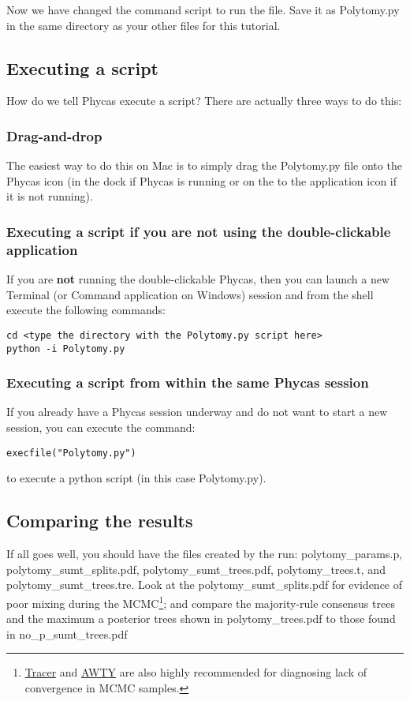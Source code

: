 \documentclass{article}
\newcommand{\phycas}{Phycas\xspace}
\newcommand{\localfile}[1]{\textsf{#1}\xspace}
\begin{document}
Now we have changed the command script to run the file. Save it as \localfile{Polytomy.py} in the same directory as your other files for this tutorial.

\subsection{Executing a script}
How do we tell \phycas execute a script?
There are actually three ways to do this:
\subsubsection{Drag-and-drop}
The easiest way to do this on Mac is to simply drag the \localfile{Polytomy.py} file onto the \phycas icon (in the dock if \phycas is running or on the to the application icon if it is not running).

\subsubsection{Executing a script if you are not using the double-clickable application}
If you are {\bf not} running the double-clickable \phycas, then you can launch a new
Terminal (or Command application on Windows) session and from the shell execute the following commands:
\begin{verbatim}
cd <type the directory with the Polytomy.py script here>
python -i Polytomy.py
\end{verbatim}

\subsubsection{Executing a script from within the same \phycas session}
If you already have a \phycas session underway and do not want to start a
new session, you can execute the command:
\begin{verbatim}
execfile("Polytomy.py")
\end{verbatim}
to execute a python script (in this case  \localfile{Polytomy.py}).


\subsection{Comparing the results}
If all goes well, you should have the files created by the run:
\localfile{polytomy\_params.p}, \localfile{polytomy\_sumt\_splits.pdf}, \localfile{polytomy\_sumt\_trees.pdf}, \localfile{polytomy\_trees.t}, and \localfile{polytomy\_sumt\_trees.tre}.
Look at the \localfile{polytomy\_sumt\_splits.pdf}  for evidence of poor mixing during the MCMC\footnote{
\href{http://beast.bio.ed.ac.uk/}{Tracer} and \href{http://ceb.csit.fsu.edu/awty}{AWTY} are also highly
recommended for diagnosing lack of convergence in MCMC samples.}; 
and compare the majority-rule consensus trees and the maximum a posterior trees shown in  \localfile{polytomy\_trees.pdf} to those found in \localfile{no\_p\_sumt\_trees.pdf}
\end{document}
